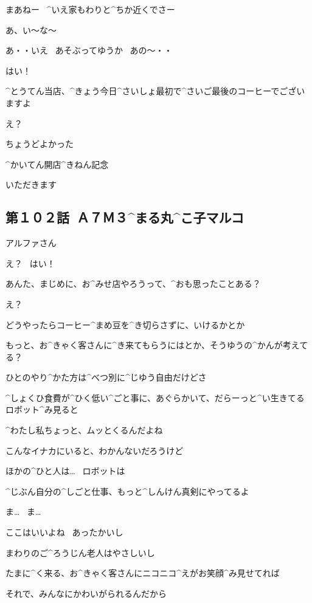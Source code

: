 \Maruko まあねー
\ ^{いえ}{家}もわりと^{ちか}{近}くでさー

\Alpha あ、い〜な〜

\Maruko あ・・いえ
\ あそぶってゆうか
\ あの〜・・

\page[22]
\Alpha はい！

\Alpha ^{とうてん}{当店}、^{きょう}{今日}^{さいしょ}{最初}で^{さいご}{最後}のコーヒーでございますよ

\Kokone え？

\Alpha ちょうどよかった

\Alpha ^{かいてん}{開店}^{きねん}{記念}

\Kokone いただきます


\subsection{第１０２話\ Ａ７Ｍ３^{まる}{丸}^{こ}{子}マルコ}

\page[27]
\Maruko アルファさん

\Alpha え？
\ はい！

\page[28]
\Maruko あんた、まじめに、お^{みせ}{店}やろうって、^{おも}{思}ったことある？

\Alpha え？

\Maruko どうやったらコーヒー^{まめ}{豆}を^{き}{切}らさずに、いけるかとか

\Maruko もっと、お^{きゃく}{客}さんに^{き}{来}てもらうにはとか、そうゆうの^{かんが}{考}えてる？

\page[29]
\Maruko ひとのやり^{かた}{方}は^{べつ}{別}に^{じゆう}{自由}だけどさ

\Maruko ^{しょくひ}{食費}が^{ひく}{低}い^{ごと}{事}に、あぐらかいて、だらーっと^{い}{生}きてるロボット^{み}{見}ると

\Maruko ^{わたし}{私}ちょっと、ムッとくるんだよね

\Maruko こんなイナカにいると、わかんないだろうけど

\Maruko ほかの^{ひと}{人}は…
\ ロボットは

\Maruko ^{じぶん}{自分}の^{しごと}{仕事}、もっと^{しんけん}{真剣}にやってるよ

\Kokone ま…
\ ま…

\page[30]
\Maruko ここはいいよね
\ あったかいし

\Maruko まわりのご^{ろうじん}{老人}はやさしいし

\Maruko たまに^{く}{来}る、お^{きゃく}{客}さんにニコニコ^{えがお}{笑顔}^{み}{見}せてれば

\Maruko それで、みんなにかわいがられるんだから

